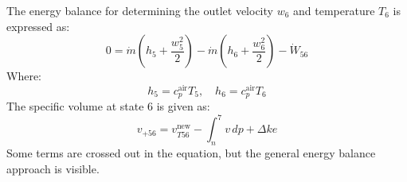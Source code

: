 The energy balance for determining the outlet velocity \( w_6 \) and temperature \( T_6 \) is expressed as:  
\[
0 = \dot{m} \left( h_5 + \frac{w_5^2}{2} \right) - \dot{m} \left( h_6 + \frac{w_6^2}{2} \right) - \dot{W}_{56}
\]  
Where:  
\[
h_5 = c_p^{\text{air}} T_5, \quad h_6 = c_p^{\text{air}} T_6
\]  
The specific volume at state 6 is given as:  
\[
v_{+56} = v_{T56}^{\text{new}} - \int_n^7 v \, dp + \Delta ke
\]  
Some terms are crossed out in the equation, but the general energy balance approach is visible.